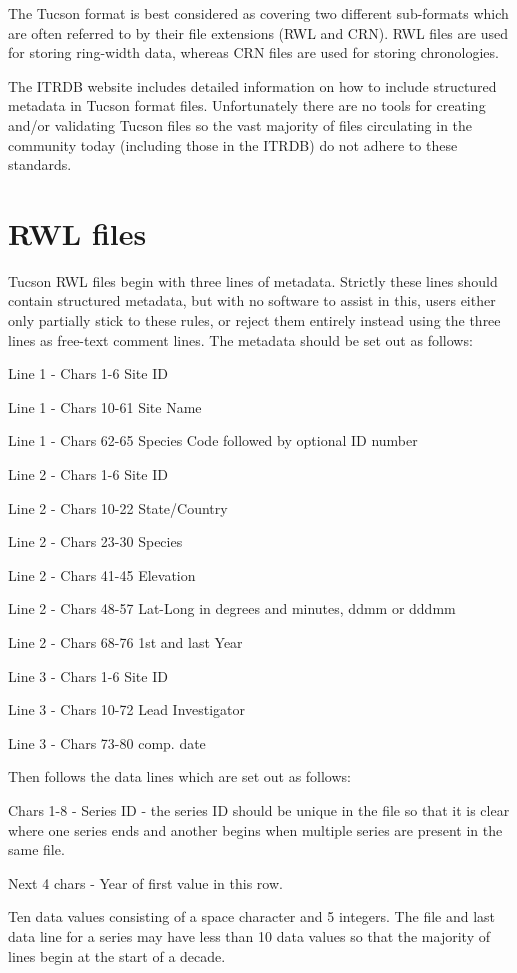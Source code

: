 The Tucson format is best considered as covering two different sub-formats which are often referred to by their file extensions (RWL and CRN). RWL files are used for storing ring-width data, whereas CRN files are used for storing chronologies.

The ITRDB website includes detailed information on how to include structured metadata in Tucson format files. Unfortunately there are no tools for creating and/or validating Tucson files so the vast majority of files circulating in the community today (including those in the ITRDB) do not adhere to these standards. 

\section{RWL files}
Tucson RWL files begin with three lines of metadata. Strictly these lines should contain structured metadata, but with no software to assist in this, users either only partially stick to these rules, or reject them entirely instead using the three lines as free-text comment lines. The metadata should be set out as follows:

\begin{itemize*}
    \item  Line 1 - Chars 1-6 Site ID
    \item  Line 1 - Chars 10-61 Site Name
    \item  Line 1 - Chars 62-65 Species Code followed by optional ID number
    \item  Line 2 - Chars 1-6 Site ID
    \item  Line 2 - Chars 10-22 State/Country
    \item  Line 2 - Chars 23-30 Species
    \item  Line 2 - Chars 41-45 Elevation
    \item  Line 2 - Chars 48-57 Lat-Long in degrees and minutes, ddmm or dddmm
    \item  Line 2 - Chars 68-76 1st and last Year
    \item  Line 3 - Chars 1-6 Site ID
    \item  Line 3 - Chars 10-72 Lead Investigator
    \item  Line 3 - Chars 73-80 comp. date 
\end{itemize*}

Then follows the data lines which are set out as follows:

\begin{itemize*}
    \item  Chars 1-8 - Series ID - the series ID should be unique in the file so that it is clear where one series ends and another begins when multiple series are present in the same file.
    \item  Next 4 chars - Year of first value in this row.
    \item  Ten data values consisting of a space character and 5 integers. The file and last data line for a series may have less than 10 data values so that the majority of lines begin at the start of a decade.  
\end{itemize*}

